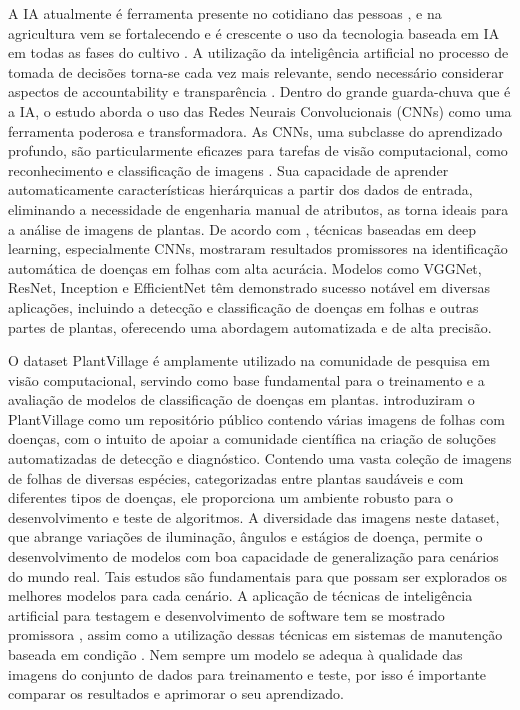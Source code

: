 \documentclass[12pt]{article}
\begin{document}
A IA atualmente é ferramenta presente no cotidiano das pessoas \cite{garcia2020etica}, e na agricultura vem se fortalecendo e é crescente o uso da tecnologia baseada em IA em todas as fases do cultivo \cite{vicari2021influencias}. A utilização da inteligência artificial no processo de tomada de decisões torna-se cada vez mais relevante, sendo necessário considerar aspectos de accountability e transparência \cite{pinto2020utilizacao}. Dentro do grande guarda-chuva que é a IA, o estudo aborda o uso das Redes Neurais Convolucionais (CNNs) como uma ferramenta poderosa e transformadora. As CNNs, uma subclasse do aprendizado profundo, são particularmente eficazes para tarefas de visão computacional, como reconhecimento e classificação de imagens \cite{simeon2008aplicacao}. Sua capacidade de aprender automaticamente características hierárquicas a partir dos dados de entrada, eliminando a necessidade de engenharia manual de atributos, as torna ideais para a análise de imagens de plantas. De acordo com \cite{mohanty2016deep}, técnicas baseadas em deep learning, especialmente CNNs, mostraram resultados promissores na identificação automática de doenças em folhas com alta acurácia. Modelos como VGGNet, ResNet, Inception e EfficientNet têm demonstrado sucesso notável em diversas aplicações, incluindo a detecção e classificação de doenças em folhas e outras partes de plantas, oferecendo uma abordagem automatizada e de alta precisão.  

O dataset PlantVillage é amplamente utilizado na comunidade de pesquisa em visão computacional, servindo como base fundamental para o treinamento e a avaliação de modelos de classificação de doenças em plantas. \cite{hughes2015open} introduziram o PlantVillage como um repositório público contendo várias imagens de folhas com doenças, com o intuito de apoiar a comunidade científica na criação de soluções automatizadas de detecção e diagnóstico. Contendo uma vasta coleção de imagens de folhas de diversas espécies, categorizadas entre plantas saudáveis e com diferentes tipos de doenças, ele proporciona um ambiente robusto para o desenvolvimento e teste de algoritmos. A diversidade das imagens neste dataset, que abrange variações de iluminação, ângulos e estágios de doença, permite o desenvolvimento de modelos com boa capacidade de generalização para cenários do mundo real. Tais estudos são fundamentais para que possam ser explorados os melhores modelos para cada cenário. A aplicação de técnicas de inteligência artificial para testagem e desenvolvimento de software tem se mostrado promissora \cite{sales2020analise}, assim como a utilização dessas técnicas em sistemas de manutenção baseada em condição \cite{simeon2008aplicacao}. Nem sempre um modelo se adequa à qualidade das imagens do conjunto de dados para treinamento e teste, por isso é importante comparar os resultados e aprimorar o seu aprendizado.  
\end{document}
